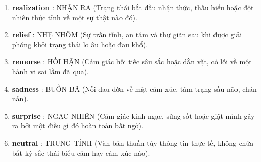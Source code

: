\begin{enumerate}
	\item \textbf{realization} : NHẬN RA (Trạng thái bắt đầu nhận thức, thấu hiểu hoặc đột nhiên thức tỉnh về một sự thật nào đó).
	
	\item \textbf{relief} : NHẸ NHÕM (Sự trấn tĩnh, an tâm và thư giãn sau khi được giải phóng khỏi trạng thái lo âu hoặc đau khổ).
	
	\item \textbf{remorse} : HỐI HẬN (Cảm giác hối tiếc sâu sắc hoặc dằn vặt, có lỗi về một hành vi sai lầm đã qua).
	
	\item \textbf{sadness} : BUỒN BÃ (Nỗi đau đớn về mặt cảm xúc, tâm trạng sầu não, chán nản).
	
	\item \textbf{surprise} : NGẠC NHIÊN (Cảm giác kinh ngạc, sửng sốt hoặc giật mình gây ra bởi một điều gì đó hoàn toàn bất ngờ).
	
	\item \textbf{neutral} : TRUNG TÍNH (Văn bản thuần túy thông tin thực tế, không chứa bất kỳ sắc thái biểu cảm hay cảm xúc nào).
\end{enumerate}